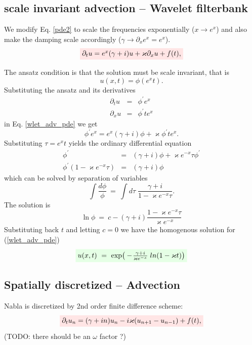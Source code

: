 \documentclass[11pt,twocolumn]{article}
\newcommand{\be}{\begin{equation}}
\newcommand{\ee}{\end{equation}}
\newcommand{\bea}{\begin{eqnarray*}}
\newcommand{\eea}{\end{eqnarray*}}
\newcommand{\w}{\omega}
\newcommand{\ka}{\varkappa}
\newcommand{\rbox}[1]{\colorbox{red!10}{$#1$}}
\newcommand{\gbox}[1]{\colorbox{green!10}{$#1$}}
\begin{document}
\subsection{scale invariant advection -- Wavelet filterbank}

We modify Eq. \ref{pde2} to scale the frequencies exponentially ($x \rightarrow e^x$) and also make
the damping scale accordingly ($\gamma \rightarrow \partial_x e^x = e^x$).
\be \label{wlet_adv_pde}
    \rbox{\partial_t u = e^x (\gamma + i) u + \varkappa \partial_x u  +  f(t),}
\ee

The ansatz condition is that the solution must be scale invariant, that is
\be \label{wlet_adv_ansatz}
    u(x,t) = \phi(e^xt).
\ee
Substituting the ansatz and its derivatives
\bea
   \partial_t u  &=&  \phi^\prime e^x \\
   \partial_x u  &=&  \phi^\prime t e^x
\eea
in Eq. \ref{wlet_adv_pde} we get
\be
   \phi^\prime e^x  =  e^x (\gamma + i) \phi + \varkappa \phi^\prime t e^x.
\ee
Substituting $\tau = e^xt$ yields the ordinary differential equation
\bea
   \phi^\prime  &=&  (\gamma + i) \phi + \varkappa e^{-x}\tau \phi^\prime \\
   \phi^\prime (1 - \varkappa e^{-x}\tau)  &=&  (\gamma + i) \phi
\eea
which can be solved by separation of variables
\be
   \int\! \frac{d\phi}{\phi} \ =\  \int\!\! d\tau \; \frac{\gamma + i}{1 - \varkappa e^{-x}\tau}.
\ee
The solution is
\be
   \ln \phi \ = \ c - (\gamma + i) \frac{1 - \varkappa e^{-x}\tau}{\varkappa e^{-x}}
\ee
Substituting back $t$ and letting $c=0$ we have the homogenous solution for (\ref{wlet_adv_pde})
\be \label{wlet_adv_solution}
    \gbox{ u(x,t) \ = \ \exp\!\big(-\!\frac{\gamma+i}{\varkappa e^{-x}} \; ln(1-\varkappa t)\big) }
\ee








\subsection{Spatially discretized -- Advection}


Nabla is discretized by 2nd order finite difference scheme:
\be \label{pdiffe}
    \rbox{\partial_t u_n = (\gamma + i n) u_n - i \ka ( u_{n+1} - u_{n-1} )  +  f(t),}
\ee
(TODO: there should be an $\w$ factor ?)
\end{document}
